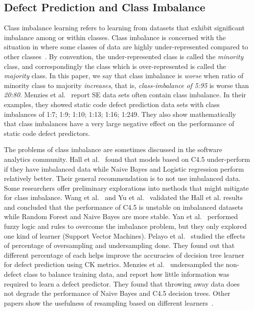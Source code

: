 \documentclass[10pt,conference]{IEEEtran}
\theoremstyle{break}
\theoremstyle{break}
\begin{document}
\subsection{Defect Prediction and Class Imbalance}
\label{sect:motivation}

Class imbalance learning refers to learning from datasets that exhibit significant imbalance among or within classes. Class imbalance  is concerned with the situation in where some classes of data are
highly under-represented compared to other classes~\cite{he2009learning}.
By convention,
the under-represented class is called the {\em minority} class,
and correspondingly the class which is over-represented is called the
{\em majority} class. In this paper, we say that class imbalance is {\em worse}
when ratio of minority class to majority {\em increases}, that is,
{\em class-imbalance of 5:95} is worse than {\em 20:80}. Menzies et al.~\cite{menzies2007problems} report SE data sets often contain class imbalance. In their examples, they showed static code defect prediction data sets with
class imbalances of 1:7; 1:9; 1:10; 1:13; 1:16; 1:249.
They also show mathematically that  class imbalances  have a very large  negative effect on the performance of static code defect predictors.  

The problems of class imbalance are sometimes discussed in the software analytics community.
Hall et al.~\cite{hall2012systematic} found that models based on C4.5 under-perform if they have imbalanced data while Naive Bayes and Logistic regression perform relatively better. 
Their general recommendation is to not use
imbalanced data.  
Some researchers offer preliminary explorations into methods that might mitigate for class imbalance.
Wang et al.~\cite{wang2013using} and Yu et al.~\cite{yuperformance} validated the Hall et al. results and concluded that the
performance of C4.5 is unstable on imbalanced datasets while  Random Forest and Naive Bayes are 
more stable. 
Yan et al.~\cite{yan2010software} performed fuzzy logic and rules to overcome the imbalance problem, but they only
explored one kind of learner (Support Vector Machines).
Pelayo et al.~\cite{pelayo2007applying} studied the effects of percentage of oversampling and undersampling done. They found out that different percentage of each helps improve the accuracies of decision tree learner for defect prediction using CK metrics. Menzies et al.~\cite{menzies2008implications} undersampled the non-defect class to balance training
data, and report how little information was required to learn a defect predictor. They found that throwing away data does not degrade the performance of Naive Bayes and C4.5 decision trees. Other papers show the usefulness of resampling based on different learners~\cite{pelayo2007applying, pelayo2012evaluating, riquelme2008finding}.
\end{document}
